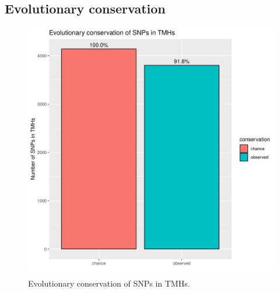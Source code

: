 \subsection{Evolutionary conservation}

\begin{figure}[!htbp]
  \includegraphics[width=\textwidth]{ncbi_peregrine_results/fig_conservation.png}
  \caption{
    Evolutionary conservation of SNPs in TMHs.
  }
  \label{fig:conservation}
\end{figure}

